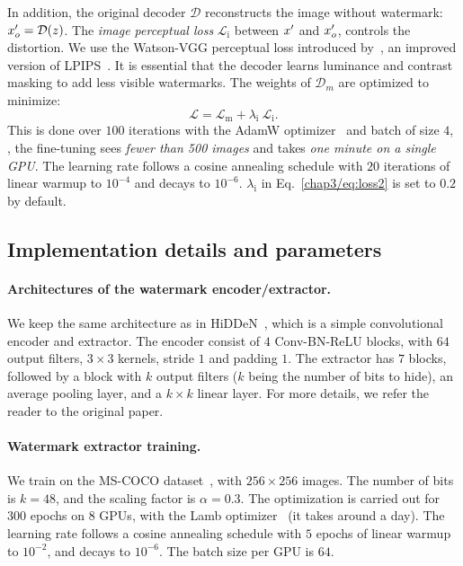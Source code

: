 In addition, the original decoder $\mathcal{D}$ reconstructs the image without watermark: $x'_o = \mathcal{D}(z)$. 
The \emph{image perceptual loss} $\mathcal{L}_\mathrm{i}$ between $x'$ and $x'_o$, controls the distortion.
We use the Watson-VGG perceptual loss introduced by~\cite{czolbe2020loss}, an improved version of LPIPS~\citep{zhang2018unreasonable}.
It is essential that the decoder learns luminance and contrast masking to add less visible watermarks. %
The weights of $\mathcal{D}_m$ are optimized to minimize:
\begin{equation}\label{chap3/eq:loss2}
    \mathcal{L} = \mathcal{L}_\mathrm{m} + \lambda_\mathrm{i}~ \mathcal{L}_\mathrm{i}.
\end{equation}
\noindent
This is done over $100$ iterations with the AdamW optimizer~\citep{loshchilov2017decoupled} and batch of size $4$, \ie, the fine-tuning sees \emph{fewer than 500 images} and takes \emph{one minute on a single GPU}.
The learning rate follows a cosine annealing schedule with $20$ iterations of linear warmup to $10^{-4}$ and decays to $10^{-6}$.
$\lambda_\mathrm{i}$ in Eq.~\eqref{chap3/eq:loss2} is set to $0.2$ by default.




\subsection{Implementation details and parameters}\label{chap3/app:method-details}


\paragraph*{Architectures of the watermark encoder/extractor.}\label{chap3/app:archi-hidden}
We keep the same architecture as in HiDDeN~\citep{zhu2018hidden}, which is a simple convolutional encoder and extractor.
The encoder consist of $4$ Conv-BN-ReLU blocks, with $64$ output filters, $3\times 3$ kernels, stride $1$ and padding $1$.
The extractor has $7$ blocks, followed by a block with $k$ output filters ($k$ being the number of bits to hide), an average pooling layer, and a $k\times k$ linear layer.
For more details, we refer the reader to the original paper.

\paragraph*{Watermark extractor training.}
We train on the MS-COCO dataset~\citep{lin2014microsoft}, with $256 \times 256$ images.
The number of bits is $k=48$, and the scaling factor is $\alpha=0.3$.
The optimization is carried out for $300$ epochs on $8$ GPUs, with the Lamb optimizer~\citep{you2019lamb} (it takes around a day). 
The learning rate follows a cosine annealing schedule with $5$ epochs of linear warmup to $10^{-2}$, and decays to $10^{-6}$.
The batch size per GPU is $64$.

